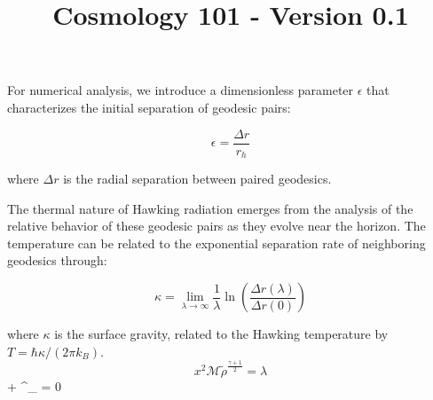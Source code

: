 \documentclass{article}\usepackage{graphicx} \usepackage{amsmath} \usepackage{colortbl}\title{Cosmology 101 - Version 0.1}
\begin{document}
For numerical analysis, we introduce a dimensionless parameter $\epsilon$ that characterizes the initial separation of geodesic pairs:

\begin{equation}
\epsilon = \frac{\Delta r}{r_h}
\end{equation}

where $\Delta r$ is the radial separation between paired geodesics.

The thermal nature of Hawking radiation emerges from the analysis of the relative behavior of these geodesic pairs as they evolve near the horizon. The temperature can be related to the exponential separation rate of neighboring geodesics through:

\begin{equation}
\kappa = \lim_{\lambda \to \infty} \frac{1}{\lambda} \ln\left(\frac{\Delta r(\lambda)}{\Delta r(0)}\right)
\end{equation}

where $\kappa$ is the surface gravity, related to the Hawking temperature by $T = \hbar\kappa/(2\pi k_B)$. \begin{equation}x^2 \mathcal{M} \tilde{\rho }^{\frac{\gamma +1}{2}}=\lambda \label{Mi ecuacion 8} \end{equation} + \Gamma^{\mu}_{\alpha\beta} = 0
\end{document}
